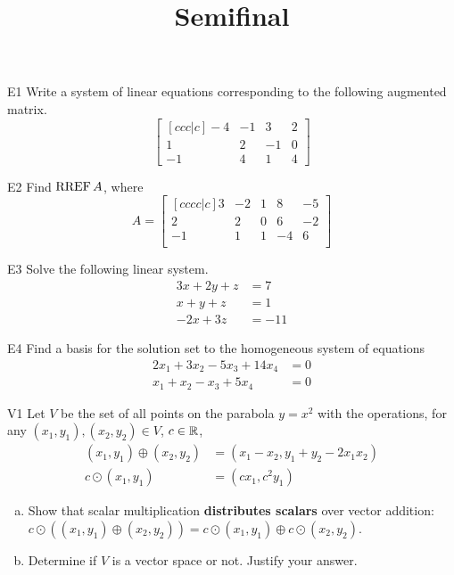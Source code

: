 \documentclass{sbgLAsemi}
\title{Semifinal}
\begin{document}
\begin{problem}{E1}
Write a system of linear equations corresponding to the following
augmented matrix.
\[
\begin{bmatrix}[ccc|c]
-4 & -1 & 3 & 2  \\
1 & 2 & -1 & 0 \\
-1 & 4 & 1 & 4
\end{bmatrix}
\]
\end{problem}

\begin{problem}{E2}
Find \(\operatorname{RREF} A\), where
\[
  A =
  \begin{bmatrix}[cccc|c]
    3 & -2 & 1 & 8 & -5 \\
    2 & 2 & 0 & 6 & -2 \\
    -1 & 1 & 1 & -4 & 6 \\
  \end{bmatrix}
\]
\end{problem}

\begin{problem}{E3}
Solve the following linear system.
\begin{align*}
3x+2y+z &= 7 \\
x+y+z &= 1 \\
-2x+3z &= -11
\end{align*}
\end{problem}

\begin{problem}{E4}
Find a basis for the solution set to the homogeneous system of equations
\begin{align*}
2x_1+3x_2-5x_3+14x_4 &= 0\\
x_1+x_2-x_3+5x_4 &= 0
\end{align*}
\end{problem}

\begin{problem}{V1}
Let $V$ be the set of all points on the parabola $y=x^2$ with the operations, for any $(x_1,y_1), (x_2,y_2) \in V$, $c \in \mathbb{R}$,
\begin{align*}
(x_1,y_1) \oplus (x_2,y_2) &= (x_1-x_2,y_1+y_2-2x_1x_2) \\
c \odot (x_1,y_1) &= (cx_1, c^2y_1)
\end{align*}
\begin{enumerate}[(a)]
\item Show that scalar multiplication \textbf{distributes scalars} over
      vector addition:
      \(c\odot((x_1,y_1) \oplus (x_2,y_2))=
      c\odot(x_1,y_1) \oplus c\odot(x_2,y_2)\).
\item Determine if $V$ is a vector space or not.  Justify your answer.
\end{enumerate}
\end{problem}
\end{document}
